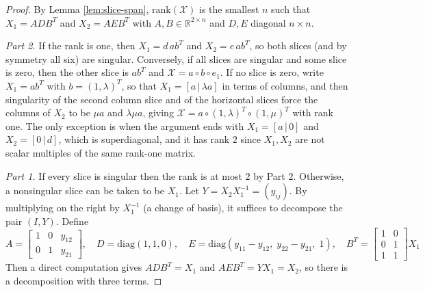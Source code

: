   \begin{proof}
    By Lemma \ref{lem:slice-span}, $\mathrm{rank}(\mathcal{X})$ is the smallest $n$ such that $X_1 = A D B^T$ and $X_2 = A E B^T$ with $A, B \in \mathbb{R}^{2 \times n}$ and $D, E$ diagonal $n \times n$.

    \textit{Part 2.} If the rank is one, then $X_1 = d \, a b^T$ and $X_2 = e \, a b^T$, so both slices (and by symmetry all six) are singular. Conversely, if all slices are singular and some slice is zero, then the other slice is $a b^T$ and $\mathcal{X} = a \circ b \circ e_1$. If no slice is zero, write $X_1 = a b^T$ with $b = (1, \lambda)^T$, so that $X_1 = [a \,|\, \lambda a]$ in terms of columns, and then singularity of the second column slice and of the horizontal slices force the columns of $X_2$ to be $\mu a$ and $\lambda \mu a$, giving $\mathcal{X} = a \circ (1, \lambda)^T \circ (1, \mu)^T$ with rank one. The only exception is when the argument ends with $X_1 = [a \,|\, 0]$ and $X_2 = [0 \,|\, d]$, which is superdiagonal, and it has rank $2$ since $X_1, X_2$ are not scalar multiples of the same rank-one matrix.

    \textit{Part 1.} If every slice is singular then the rank is at most $2$ by Part 2. Otherwise, a nonsingular slice can be taken to be $X_1$. Let $Y = X_2 X_1^{-1} = (y_{ij})$. By multiplying on the right by $X_1^{-1}$ (a change of basis), it suffices to decompose the pair $(I, Y)$. Define
    \begin{equation}
      A = \begin{bmatrix} 1 & 0 & y_{12} \\ 0 & 1 & y_{21} \end{bmatrix}, \quad
      D = \mathrm{diag}(1, 1, 0), \quad
      E = \mathrm{diag}(y_{11} - y_{12}, \; y_{22} - y_{21}, \; 1), \quad
      B^T = \begin{bmatrix} 1 & 0 \\ 0 & 1 \\ 1 & 1 \end{bmatrix} X_1
    \end{equation}
    Then a direct computation gives $A D B^T = X_1$ and $A E B^T = Y X_1 = X_2$, so there is a decomposition with three terms.


\end{proof}
